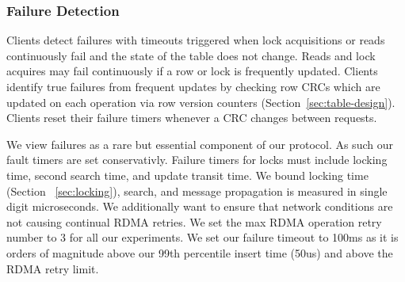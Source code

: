 
\subsubsection{Failure Detection} 

Clients detect failures with timeouts triggered when lock
acquisitions or reads continuously fail and the state of the
table does not change. Reads and lock acquires may fail
continuously if a row or lock is frequently updated. Clients
identify true failures from frequent updates by checking row
CRCs which are updated on each operation via row version
counters (Section~\ref{sec:table-design}). Clients reset
their failure timers whenever a CRC changes between
requests. 

 We view failures
as a rare but essential component of our protocol. As such
our fault timers are set conservativly. Failure timers for
locks must include locking time, second search time, and
update transit time. We bound locking time (Section
~\ref{sec:locking}), search, and message propagation is
measured in single digit microseconds. We additionally want
to ensure that network conditions are not causing continual
RDMA retries. We set the max RDMA operation retry number to
3 for all our experiments. We set our failure timeout to
100ms as it is orders of magnitude above our 99th percentile
insert time (50us) and above the RDMA retry limit.


